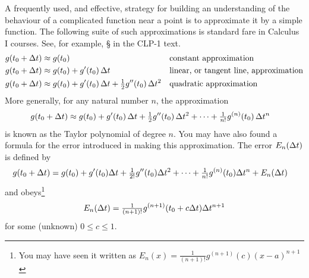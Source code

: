 A frequently used, and effective, strategy for building an understanding
of the behaviour of a complicated function near a point is to
approximate it by a simple function. The following suite of such
approximations is standard fare in Calculus I courses. 
See, for example, \S{} in the CLP-1 text.
\begin{align*}
g(t_0+\Delta t) &\approx g(t_0) 
                   &&\text{constant approximation} \\
g(t_0+\Delta t) &\approx g(t_0) +g'(t_0)\,\Delta t  
                    &&\text{linear, or tangent line, approximation} \\
g(t_0+\Delta t) &\approx g(t_0) +g'(t_0)\,\Delta t +\tfrac{1}{2} g''(t_0)\,\Delta t^2
                    &&\text{quadratic approximation} 
\end{align*}
More generally, for any natural number $n$, the  approximation 
\begin{align*}
g(t_0+\Delta t) &\approx g(t_0) +g'(t_0)\,\Delta t + \tfrac{1}{2} g''(t_0)\,\Delta t^2
                    +\cdots+ \tfrac{1}{n!} g^{(n)}(t_0)\,\Delta t^n
\end{align*}
is known as the Taylor polynomial of degree $n$. 
You may have also found a formula for the error introduced in making this 
approximation. The error $E_n(\Delta t)$ is defined by
\begin{align*}
g(t_0+\Delta t)
&=
g(t_0)+g'(t_0)\Delta t+\tfrac{1}{2!}g''(t_0)\Delta t^2
+\cdots
+\tfrac{1}{n!}g^{(n)}(t_0) \Delta t^n +E_n(\Delta t)
\end{align*}
and obeys\footnote{You may have seen it written as 
$E_n(x)=\tfrac{1}{(n+1)!}g^{(n+1)}(c) (x-a)^{n+1}$}
\begin{equation*}
E_n(\Delta t)=
\tfrac{1}{(n+1)!}g^{(n+1)}(t_0+c\Delta t) \Delta t^{n+1}
\end{equation*}
for some (unknown) $0\le c\le 1$. 

